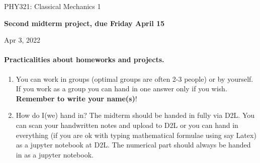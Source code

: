 \documentclass[%
oneside,                 %
final,                   %
10pt]{article}
\begin{document}

\newcommand{\exercisesection}[1]{\subsection*{#1}}






\thispagestyle{empty}

\begin{center}
{\LARGE\bf
\begin{spacing}{1.25}
PHY321: Classical Mechanics 1
\end{spacing}
}
\end{center}


\begin{center}
{\bf Second midterm project, due Friday April 15${}^{}$} \\ [0mm]
\end{center}

\begin{center}
\end{center}
    

\begin{center}
Apr 3, 2022
\end{center}

\vspace{1cm}


\paragraph{Practicalities about  homeworks and projects.}
\begin{enumerate}
\item You can work in groups (optimal groups are often 2-3 people) or by yourself. If you work as a group you can hand in one answer only if you wish. \textbf{Remember to write your name(s)}!

\item How do I(we)  hand in?  The midterm should be handed in fully via D2L. You can scan your handwritten notes and upload to D2L or you can hand in everything (if you are ok with typing mathematical formulae using say Latex) as a jupyter notebook at D2L. The numerical part should always be handed in as a jupyter notebook.
\end{enumerate}
\end{document}
